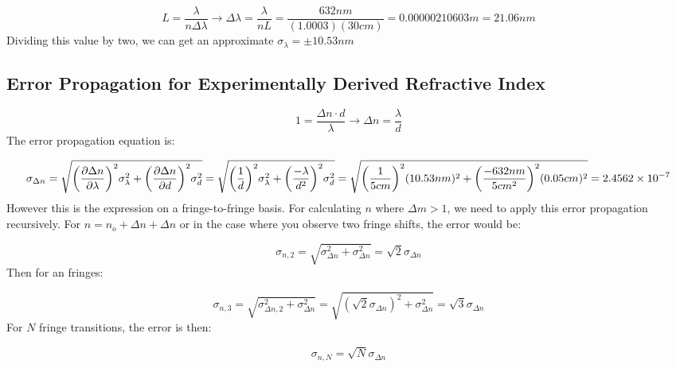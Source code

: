 \documentclass{article}
\begin{document}
\begin{equation}
	L = \frac{\lambda}{n\Delta\lambda} \rightarrow \Delta\lambda = \frac{\lambda}{nL} = \frac{632nm}{(1.0003)(30cm)} = 0.00000210603m = 21.06nm
\end{equation}Dividing this value by two, we can get an approximate $\sigma_\lambda = \pm 10.53nm$ 




\subsection{Error Propagation for Experimentally Derived Refractive Index}

\begin{equation}
	1 = \frac{\Delta{n}\cdot d}{\lambda} \rightarrow \Delta{n} = \frac{\lambda}{d}
\end{equation}The error propagation equation is:

\begin{equation}
	\sigma_{\Delta{n}} = \sqrt{ \bigg(  \frac{\partial\Delta{n}}{\partial\lambda} \bigg)^2\sigma_\lambda^2 + \bigg( \frac{\partial\Delta{n}}{\partial{d}}  \bigg)^2\sigma_d^2} = \sqrt{ \bigg(  \frac{1}{d} \bigg)^2\sigma_\lambda^2 + \bigg( \frac{-\lambda}{d^2}  \bigg)^2\sigma_d^2}
    = \sqrt{ \bigg(  \frac{1}{5cm} \bigg)^2(10.53nm)^2 + \bigg( \frac{-632nm}{5cm^2}  \bigg)^2(0.05cm)^2} = \num{2.4562d-7}
\end{equation}
However this is the expression on a fringe-to-fringe basis. For calculating $n$ where $\Delta{m} > 1$, we need to apply this error propagation recursively.
For $n = n_o + \Delta{n} + \Delta{n}$ or in the case where you observe two fringe shifts, the error would be:

\begin{equation}
	\sigma_{n,2} = \sqrt{\sigma_{\Delta{n}}^2 + \sigma_{\Delta{n}}^2} = \sqrt{2}\sigma_{\Delta{n}}
\end{equation}Then for an fringes:

\begin{equation}
	\sigma_{n,3} = \sqrt{\sigma_{\Delta{n,2}}^2 + \sigma_{\Delta{n}}^2} =\sqrt{(\sqrt{2}\sigma_{\Delta{n}})^2 + \sigma_{\Delta{n}}^2} = \sqrt{3}\sigma_{\Delta{n}}
\end{equation}For $N$ fringe transitions, the error is then:

\begin{equation}
  \sigma_{n,N} = \sqrt{N}\sigma_{\Delta{n}}
\end{equation}
\end{document}
